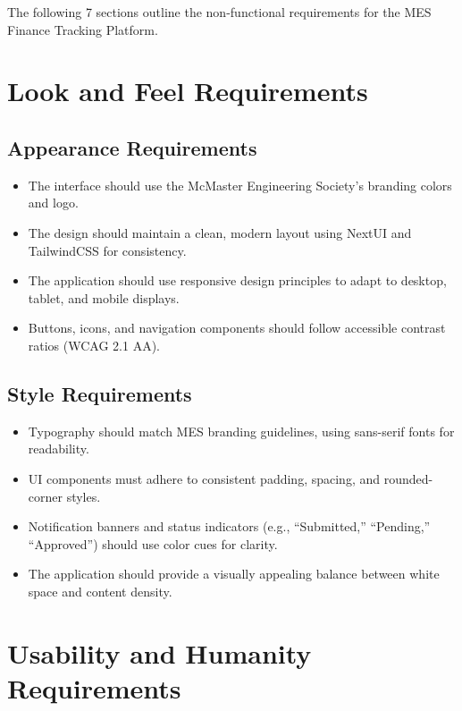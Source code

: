 \documentclass[12pt]{article}
\begin{document}
The following 7 sections outline the non-functional requirements for the MES Finance Tracking Platform.

\section{Look and Feel Requirements}
    \subsection{Appearance Requirements}
    \begin{itemize}
        \item The interface should use the McMaster Engineering Society’s branding colors and logo.
        \item The design should maintain a clean, modern layout using NextUI and TailwindCSS for consistency.
        \item The application should use responsive design principles to adapt to desktop, tablet, and mobile displays.
        \item Buttons, icons, and navigation components should follow accessible contrast ratios (WCAG 2.1 AA).
    \end{itemize}

    \subsection{Style Requirements}
    \begin{itemize}
        \item Typography should match MES branding guidelines, using sans-serif fonts for readability.
        \item UI components must adhere to consistent padding, spacing, and rounded-corner styles.
        \item Notification banners and status indicators (e.g., “Submitted,” “Pending,” “Approved”) should use color cues for clarity.
        \item The application should provide a visually appealing balance between white space and content density.
    \end{itemize}
\section{Usability and Humanity Requirements}
\end{document}
